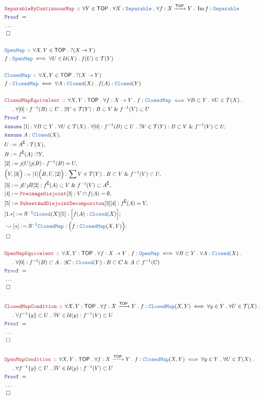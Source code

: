 \documentclass[12pt]{scrartcl}
\newcommand{\TYPE}[1]{\textcolor{NavyBlue}{\mathtt{#1}}}
\newcommand{\LOGIC}[1]{\textcolor{Blue}{\mathtt{#1}}}
\newcommand{\THM}[1]{\textcolor{Maroon}{\mathtt{#1}}}
\renewcommand{\.}{\; . \;}
\newcommand{\de}{: \kern 0.1pc =}
\newcommand{\Theorem}[2]{& \THM{#1} \, :: \, #2 \\ & \Proof = \\ }
\newcommand{\DeclareType}[2]{& \TYPE{#1} \, :: \, #2 \\}
\newcommand{\DefineType}[3]{& #1 : \TYPE{#2} \iff #3 \\}
\newcommand{\NewLine}{\\ & \kern 1pc}
\newcommand{\Page}[1]{ \begin{align*} #1 \end{align*}   }
\newcommand{ \bd }{ \ByDef }
\newcommand{\NoProof}{ & \ldots \\ \EndProof}
\renewcommand{\And}{\; \& \;}
\DeclareMathOperator*{\im}{Im}
\newcommand{\Arrow}{\xrightarrow}
\renewcommand{\c}{\complement}
\newcommand{\Say}[3]{& #1 \de #2 : #3, \\}
\newcommand{\Conclude}[3]{& #1 \de #2 : #3; \\}
\newcommand{\DeriveConclude}[3]{& \leadsto #1 \de #2 : #3 ; \\}
\newcommand{\Assume}[2]{& \LOGIC{Assume} \; #1 : #2, \\}
\newcommand{\QED}{\; \square}
\newcommand{\EndProof}{& \QED \\}
\newcommand{\ByDef}{\eth}
\newcommand{\ByConstr}{\jmath}
\newcommand{\Proof}{\LOGIC{Proof} \; }
\newcommand{\TOP}{\mathsf{TOP}}
\newcommand{\T}{\mathcal{T}}
\newcommand{\U}{\mathcal{U}}
\begin{document}
\Page{
	\Theorem{SeparableByContinuousMap}
	{
		\forall Y \in \TOP \.
		\forall X : \TYPE{Separable} \.
		\forall f : X \Arrow{\TOP} Y \.
		\im f  : \TYPE{Separable} 
	}
	\NoProof
	\\
	\DeclareType{OpenMap}
	{
		\forall X,Y \in \TOP \.
		?(X \to Y)
	}
	\DefineType{f}{OpenMap}
	{
		\forall U \in \U(X) \.
		f(U) \in \T(Y)
	}
	\\
	\DeclareType{ClosedMap}
	{
		\forall X,Y \in \TOP \.
		?(X \to Y)
	}
	\DefineType{f}{ClosedMap}
	{
		\forall A : \TYPE{Closed}(X) \.
		f(A) : \TYPE{Closed}(Y)
	}
	\\
	\Theorem{ClosedMapEquivalent}
	{
		\forall X,Y : \TOP \.
		\forall f : X \to Y \.
		f : \TYPE{ClosedMap} \iff
		\forall B \subset Y \.
		\forall U \in \T(X) \.
		\NewLine \. 
		\forall [0] : f^{-1}(B) \subset U \.
		\exists V \in \T(Y) : B \subset V
		\And f^{-1}(V) \subset U
	}
	\Assume{[1]}{   
		\forall B \subset Y \. 
		\forall U \in \T(X) \. 
		\forall [0] :  f^{-1}(B) \subset  U\.
		\exists V \in \T(Y) :  B \subset V \And f^{-1}(V) \subset U
	}
	\Assume{A}{\TYPE{Closed}(X)}
	\Say{U}{A^\c}{\T(X)}
	\Say{B}{f^\c(A)}{?Y}
	\Say{[2]}{\ByConstr(U)\ByConstr(B)}{f^{-1}(B) = U}
	\Say{\Big( V, [3]\Big)}{[1]\Big(B,U,[2]\Big)}
	{
		\sum V \in T(Y)  \.  B \subset V \And f^{-1}(V) \subset U
	}
	\Say{[3]}{\ByConstr U \ByConstr B [2]} 
	{
		f^\c(A) \subset V   \And f^{-1}(V) \subset A^{\c}
	}
	\Say{[4]}{\THM{PreimageDisjoint}[3]}{  V \cap f(A) = \emptyset }
	\Say{[5]}{\THM{SubsetAndDisjointDecompositon}[3][4]}{f^\c(A) = V}
	\Conclude{[1.*]}{\bd^{-1}\TYPE{Closed}(X)[5]}{\Big[ f(A) : \TYPE{Closed}(X)  \Big]}
	\DeriveConclude{[*]}{\bd^{-1} \TYPE{ClosedMap}}
	{
		\Big( f : \TYPE{ClosedMap}(X,Y) \Big)		
	}
	\EndProof
	\\
	\Theorem{OpenMapEquivalent}
	{
		\forall X,Y : \TOP \.
		\forall f : X \to Y \.
		f : \TYPE{OpenMap} \iff
		\forall B \subset Y \.
		\forall A : \TYPE{Closed}(X) \.
		\NewLine \. 
		\forall [0] : f^{-1}(B) \subset A  \.
		\exists C : \TYPE{Closed}(Y) : B \subset C \And A \subset f^{-1}(C)
	}
	\NoProof
	\\
	\Theorem{ClosedMapCondition}
	{
		\forall X,Y : \TOP \.
		\forall f : X \Arrow{\TOP} Y \.
		f : \TYPE{ClosedMap}(X,Y) \iff 
		\forall y \in Y \. 
		\forall U \in \T(X) \. 
		\NewLine \.
		\forall f^{-1}\{y\} \subset U \.
		\exists V \in \U(y) :
		f^{-1}(V) \subset U
	}
	\NoProof
	\\
	\Theorem{OpenMapCondition}
	{
		\forall X,Y : \TOP \.
		\forall f : X \Arrow{\TOP} Y \.
		f : \TYPE{ClosedMap}(X,Y) \iff 
		\forall y \in Y \. 
		\forall U \in \T(X) \. 
		\NewLine \.
		\forall f^{-1}\{y\} \subset U \.
		\exists V \in \U(y) :
		f^{-1}(V) \subset U
	}
	\NoProof
}
\end{document}

